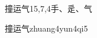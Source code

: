 \begin{entry}{撞运气}{15,7,4}{⼿、⾡、⽓}
  \begin{phonetics}{撞运气}{zhuang4yun4qi5}
  \end{phonetics}
\end{entry}

